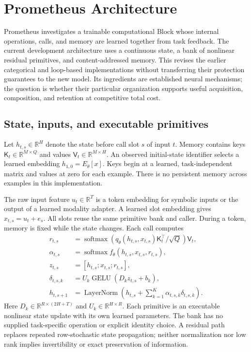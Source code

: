 \section{Prometheus Architecture}
\label{sec:architecture-main}

Prometheus investigates a trainable computational Block whose internal
operations, calls, and memory are learned together from task feedback. The
current development architecture uses a continuous state, a bank of nonlinear
residual primitives, and content-addressed memory. This revises the earlier
categorical and loop-based implementations without transferring their
protection guarantees to the new model. Its ingredients are established neural
mechanisms; the question is whether their particular organization supports
useful acquisition, composition, and retention at competitive total cost.

\subsection{State, inputs, and executable primitives}

Let $h_{t,s}\in\mathbb R^H$ denote the state before call slot $s$ of input $t$.
Memory contains keys $\mathsf K_t\in\mathbb R^{M\times Q}$ and values
$\mathsf V_t\in\mathbb R^{M\times H}$. An observed initial-state identifier
selects a learned embedding $h_{1,0}=E_\theta[x]$. Keys begin at a learned,
task-independent matrix and values at zero for each example. There is no
persistent memory across examples in this implementation.

The raw input feature $u_t\in\mathbb R^T$ is a token embedding for symbolic
inputs or the output of a learned modality adapter. A learned slot embedding
gives $x_{t,s}=u_t+e_s$. All slots reuse the same primitive bank and caller.
During a token, memory is fixed while the state changes. Each call computes
\begin{align}
 r_{t,s}&=\operatorname{softmax}\!\left(
   q_\theta(h_{t,s},x_{t,s})\mathsf K_t^\top/\sqrt Q\right)\mathsf V_t,
   \\[-1mm]
 \alpha_{t,s}&=\operatorname{softmax}
   f_\theta(h_{t,s},x_{t,s},r_{t,s}),\\
 z_{t,s}&=[h_{t,s};x_{t,s};r_{t,s}],\\
 \delta_{t,s,k}&=U_k\operatorname{GELU}(D_k z_{t,s}+b_k),\\
 h_{t,s+1}&=\operatorname{LayerNorm}\!\left(
    h_{t,s}+\sum_{k=1}^{K}\alpha_{t,s,k}\delta_{t,s,k}\right).
 \label{eq:main-block-computation}
\end{align}
Here $D_k\in\mathbb R^{R\times(2H+T)}$ and
$U_k\in\mathbb R^{H\times R}$. Each primitive is an executable nonlinear
state update with its own learned parameters. The bank has no supplied
task-specific operation or explicit identity choice. A residual path replaces
repeated row-stochastic state propagation; neither normalization nor low rank
implies invertibility or exact preservation of information.

